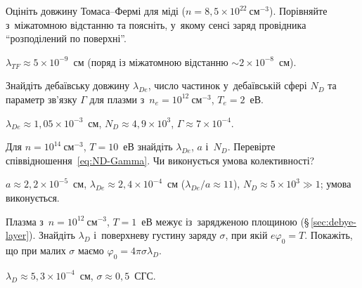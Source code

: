 \begin{problem}\label{prb:PlasmaThomasFermi}
	Оцініть довжину Томаса--Фермі для міді ($n=8{,}5\times10^{22}~\mathrm{см}^{-3}$).
	Порівняйте з~міжатомною відстанню та поясніть, у~якому сенсі заряд провідника
	\enquote{розподілений по поверхні}.
	\begin{solution}
		$\lambda_{TF}\approx5\times10^{-9}$~см (поряд із міжатомною відстанню $\sim2\times10^{-8}$~см).
	\end{solution}
\end{problem}

\begin{problem}\label{prb:PlasmaDebye}
	Знайдіть дебаївську довжину $\lambda_{De}$, число частинок у~дебаївській сфері $N_D$
	та параметр зв'язку $\Gamma$ для плазми з~$n_e=10^{12}~\mathrm{см}^{-3}$,
	$T_e=2$~еВ.
	\begin{solution}
		$\lambda_{De}\approx1{,}05\times10^{-3}$~см, $N_D\approx4{,}9\times10^{3}$, $\Gamma\approx7\times10^{-4}$.
	\end{solution}
\end{problem}

\begin{problem}\label{prb:PlasmaCollective}
	Для $n=10^{14}~\mathrm{см}^{-3}$, $T=10$~еВ знайдіть $\lambda_{De}$, $a$
	і~$N_D$. Перевірте співвідношення~\eqref{eq:ND-Gamma}. Чи виконується умова
	колективності?
	\begin{solution}
		$a\approx2{,}2\times10^{-5}$~см, $\lambda_{De}\approx2{,}4\times10^{-4}$~см ($\lambda_{De}/a\approx11$),
	$N_D\approx5\times10^{3}\gg1$; умова виконується.
	\end{solution}
\end{problem}

\begin{problem}\label{prb:PlasmaDebyeLayer}
	Плазма з~$n=10^{12}~\mathrm{см}^{-3}$, $T=1$~еВ межує із~зарядженою
	площиною (§\,\ref{sec:debye-layer}). Знайдіть $\lambda_D$ і~поверхневу густину заряду
	$\sigma$, при якій $e\varphi_0=T$. Покажіть, що при малих $\sigma$ маємо
	$\varphi_0=4\pi\sigma\lambda_D$.
	\begin{solution}
		$\lambda_D\approx5{,}3\times10^{-4}$~см, $\sigma\approx0{,}5$~СГС.
	\end{solution}
\end{problem}

